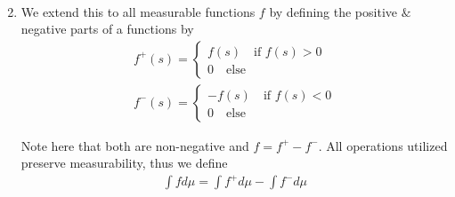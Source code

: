 \begin{enumerate}[leftmargin=*]
\begin{equation*}
\begin{gathered}
      \end{gathered}
    \end{equation*}
    \par\bigskip
  \item We extend this to all measurable functions $f$ by defining the positive $\&$ negative parts of a functions by 
    \begin{equation*}
      \begin{gathered}
        f^+(s) = \begin{cases}f(s)\quad\text{if $f(s)>0$}\\0\quad\text{else}\end{cases}\\
        f^-(s) = \begin{cases}-f(s)\quad\text{if $f(s)<0$}\\0\quad\text{else}\end{cases}
      \end{gathered}
    \end{equation*}\par
    \noindent Note here that both are non-negative and $f = f^+-f^-$. All operations utilized preserve measurability, thus we define
    \begin{equation*}
      \begin{gathered}
        \int f d\mu = \int f^+ d\mu-\int f^- d\mu
      \end{gathered}
    \end{equation*}
\end{enumerate}
\par\bigskip

